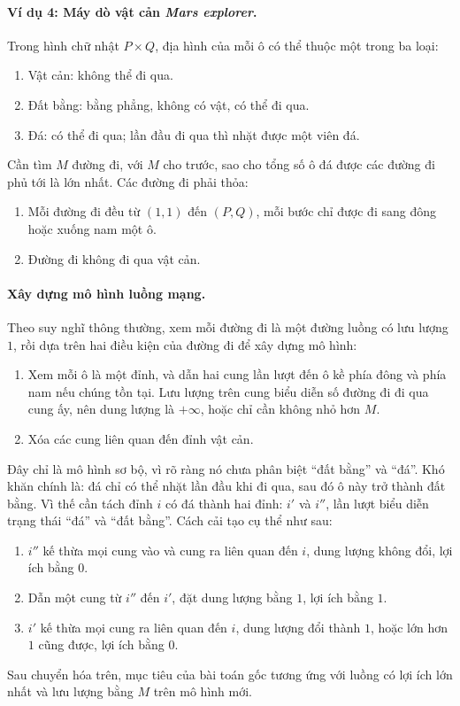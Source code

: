 \documentclass[11pt]{article}
\begin{document}
\paragraph{Ví dụ 4: Máy dò vật cản \textit{Mars explorer}.}
Trong hình chữ nhật \(P\times Q\), địa hình của mỗi ô có thể thuộc một trong
ba loại:
\begin{enumerate}
  \item Vật cản: không thể đi qua.
  \item Đất bằng: bằng phẳng, không có vật, có thể đi qua.
  \item Đá: có thể đi qua; lần đầu đi qua thì nhặt được một viên đá.
\end{enumerate}
Cần tìm \(M\) đường đi, với \(M\) cho trước, sao cho tổng số ô đá được các
đường đi phủ tới là lớn nhất. Các đường đi phải thỏa:
\begin{enumerate}
  \item Mỗi đường đi đều từ \((1,1)\) đến \((P,Q)\), mỗi bước chỉ được đi
  sang đông hoặc xuống nam một ô.
  \item Đường đi không đi qua vật cản.
\end{enumerate}

\paragraph{Xây dựng mô hình luồng mạng.}
Theo suy nghĩ thông thường, xem mỗi đường đi là một đường luồng có lưu lượng
\(1\), rồi dựa trên hai điều kiện của đường đi để xây dựng mô hình:
\begin{enumerate}
  \item Xem mỗi ô là một đỉnh, và dẫn hai cung lần lượt đến ô kề phía đông và
  phía nam nếu chúng tồn tại. Lưu lượng trên cung biểu diễn số đường đi đi qua
  cung ấy, nên dung lượng là \(+\infty\), hoặc chỉ cần không nhỏ hơn \(M\).
  \item Xóa các cung liên quan đến đỉnh vật cản.
\end{enumerate}
Đây chỉ là mô hình sơ bộ, vì rõ ràng nó chưa phân biệt ``đất bằng'' và
``đá''. Khó khăn chính là: đá chỉ có thể nhặt lần đầu khi đi qua, sau đó ô
này trở thành đất bằng. Vì thế cần tách đỉnh \(i\) có đá thành hai đỉnh:
\(i'\) và \(i''\), lần lượt biểu diễn trạng thái ``đá'' và ``đất bằng''. Cách
cải tạo cụ thể như sau:
\begin{enumerate}
  \item \(i''\) kế thừa mọi cung vào và cung ra liên quan đến \(i\), dung
  lượng không đổi, lợi ích bằng \(0\).
  \item Dẫn một cung từ \(i''\) đến \(i'\), đặt dung lượng bằng \(1\), lợi ích
  bằng \(1\).
  \item \(i'\) kế thừa mọi cung ra liên quan đến \(i\), dung lượng đổi thành
  \(1\), hoặc lớn hơn \(1\) cũng được, lợi ích bằng \(0\).
\end{enumerate}
Sau chuyển hóa trên, mục tiêu của bài toán gốc tương ứng với luồng có lợi ích
lớn nhất và lưu lượng bằng \(M\) trên mô hình mới.
\end{document}
